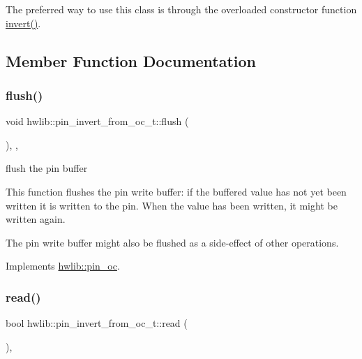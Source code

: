 The preferred way to use this class is through the overloaded constructor function \hyperlink{namespacehwlib_ab619d7f70bb62112b2a04192f5103a24}{invert()}. 

\subsection{Member Function Documentation}
\mbox{\label{classhwlib_1_1pin__invert__from__oc__t_ad470fa699bc65083d65190ff22efe600}} 
\subsubsection{\texorpdfstring{flush()}{flush()}}
{\footnotesize\ttfamily void hwlib\+::pin\+\_\+invert\+\_\+from\+\_\+oc\+\_\+t\+::flush (\begin{DoxyParamCaption}{ }\end{DoxyParamCaption})\hspace{0.3cm}{\ttfamily [inline]}, {\ttfamily [override]}, {\ttfamily [virtual]}}





flush the pin buffer

This function flushes the pin write buffer\+: if the buffered value has not yet been written it is written to the pin. When the value has been written, it might be written again.

The pin write buffer might also be flushed as a side-\/effect of other operations. 

Implements \hyperlink{classhwlib_1_1pin__oc_a021036a4566c712e43250ddd28a85e54}{hwlib\+::pin\+\_\+oc}.

\mbox{\label{classhwlib_1_1pin__invert__from__oc__t_a650ed38934b4585f42c756edd19b9c67}} 
\subsubsection{\texorpdfstring{read()}{read()}}
{\footnotesize\ttfamily bool hwlib\+::pin\+\_\+invert\+\_\+from\+\_\+oc\+\_\+t\+::read (\begin{DoxyParamCaption}{ }\end{DoxyParamCaption})\hspace{0.3cm}{\ttfamily [inline]}, {\ttfamily [virtual]}}





